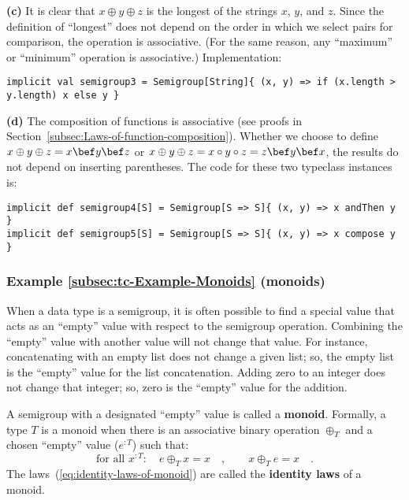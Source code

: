 \textbf{(c)} It is clear that $x\oplus y\oplus z$ is the longest
of the strings $x$, $y$, and $z$. Since the definition of \textsf{``}longest\textsf{''}
does not depend on the order in which we select pairs for comparison,
the operation is associative. (For the same reason, any \textsf{``}maximum\textsf{''}
or \textsf{``}minimum\textsf{''} operation is associative.) Implementation:
\begin{lstlisting}
implicit val semigroup3 = Semigroup[String]{ (x, y) => if (x.length > y.length) x else y }
\end{lstlisting}

\textbf{(d)} The composition of functions is associative (see proofs
in Section~\ref{subsec:Laws-of-function-composition}). Whether we
choose to define $x\oplus y\oplus z=x\bef y\bef z$ or $x\oplus y\oplus z=x\circ y\circ z=z\bef y\bef x$,
the results do not depend on inserting parentheses. The code for these
two typeclass instances is:
\begin{lstlisting}
implicit def semigroup4[S] = Semigroup[S => S]{ (x, y) => x andThen y }
implicit def semigroup5[S] = Semigroup[S => S]{ (x, y) => x compose y }
\end{lstlisting}


\subsubsection{Example \label{subsec:tc-Example-Monoids}\ref{subsec:tc-Example-Monoids}
(monoids)}

When a data type is a semigroup, it is often possible to find a special
value that acts as an \textsf{``}empty\textsf{''} value with respect to the semigroup
operation. Combining the \textsf{``}empty\textsf{''} value with another value will
not change that value. For instance, concatenating with an empty list
does not change a given list; so, the empty list is the \textsf{``}empty\textsf{''}
value for the list concatenation. Adding zero to an integer does not
change that integer; so, zero is the \textsf{``}empty\textsf{''} value for the addition.

A semigroup with a designated \textsf{``}empty\textsf{''} value is called a \textbf{monoid}.
Formally, a type $T$ is a monoid when there is an associative binary
operation $\oplus_{T}$ and a chosen \textsf{``}empty\textsf{''} value ($e^{:T}$)
such that: 
\begin{equation}
\text{for all }x^{:T}:\quad e\oplus_{T}x=x\quad,\quad\quad x\oplus_{T}e=x\quad.\label{eq:identity-laws-of-monoid}
\end{equation}
The laws~(\ref{eq:identity-laws-of-monoid}) are called the \textbf{identity
laws} of a monoid. 

